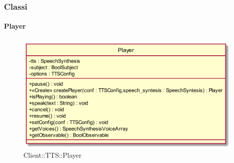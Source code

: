 \subsubsection{Classi}
\hypertarget{Player_label}{\paragraph{Player}}
\begin{figure}[h]
	\centering
	\includegraphics[width=\textwidth,height=\textheight,keepaspectratio]{images/ClassPlayer.png}
	\caption{Client::TTS::Player}
\end{figure}

